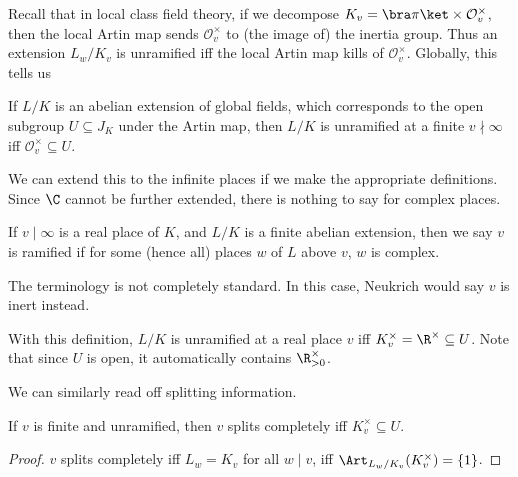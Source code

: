 \documentclass[a4paper]{article}
\begin{document}
Recall that in local class field theory, if we decompose $K_v = \bra \pi\ket \times \mathcal{O}_v^\times$, then the local Artin map sends $\mathcal{O}_v^\times$ to (the image of) the inertia group. Thus an extension $L_w/K_v$ is unramified iff the local Artin map kills of $\mathcal{O}_v^\times$. Globally, this tells us
\begin{prop}
  If $L/K$ is an abelian extension of global fields, which corresponds to the open subgroup $U \subseteq J_K$ under the Artin map, then $L/K$ is unramified at a finite $v \nmid \infty$ iff $\mathcal{O}_v^\times \subseteq U$.
\end{prop}

We can extend this to the infinite places if we make the appropriate definitions. Since $\C$ cannot be further extended, there is nothing to say for complex places.
\begin{defi}[Ramification]
  If $v \mid \infty$ is a real place of $K$, and $L/K$ is a finite abelian extension, then we say $v$ is ramified if for some (hence all) places $w$ of $L$ above $v$, $w$ is complex.
\end{defi}
The terminology is not completely standard. In this case, Neukrich would say $v$ is inert instead.

With this definition, $L/K$ is unramified at a real place $v$ iff $K_v^\times = \R^\times \subseteq U$. Note that since $U$ is open, it automatically contains $\R^\times_{> 0}$.

We can similarly read off splitting information.
\begin{prop}
  If $v$ is finite and unramified, then $v$ splits completely iff $K_v^\times \subseteq U$.
\end{prop}
\begin{proof}
  $v$ splits completely iff $L_w = K_v$ for all $w \mid v$, iff $\Art_{L_w/K_v}(K_v^\times) = \{1\}$.
\end{proof}
\end{document}
